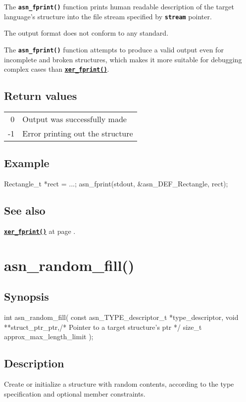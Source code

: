 \documentclass[english,oneside,12pt]{book}
\newcommand{\apisection}[2]{\clearpage\section{\label{#1}#2}}
\newcommand{\api}[2]{\hyperref[#1]{\code{#2}}}
\newcommand{\seealso}[2]{\api{#1}{#2} at page \pageref{#1}}
\newcommand{\code}[1]{\texttt{\textbf{\lstinline{#1}}}}
\begin{document}
The \code{asn_fprint()} function prints human readable description
of the target language's structure into the file stream specified by
\code{stream} pointer.

The output format does not conform to any standard.

The \code{asn_fprint()} function attempts to
produce a valid output even for incomplete and broken structures, which
makes it more suitable for debugging complex cases than
\api{sec:xer_fprint}{xer_fprint()}.

\subsection*{Return values}

\begin{tabular}[h!]{rl}
0 & Output was successfully made \\
-1 & Error printing out the structure
\end{tabular}

\subsection*{Example}
\begin{example}
Rectangle_t *rect = ...;
asn_fprint(stdout, &asn_DEF_Rectangle, rect);
\end{example}

\subsection*{See also}
\seealso{sec:xer_fprint}{xer_fprint()}.

\apisection{sec:asn_random_fill}{asn\_random\_fill()}

\subsection*{Synopsis}
\begin{signature}
int asn_random_fill(
    const asn_TYPE_descriptor_t *type_descriptor,
    void **struct_ptr_ptr,/* Pointer to a target structure's ptr */
    size_t approx_max_length_limit
);
\end{signature}

\subsection*{Description}

Create or initialize a structure with random contents, according to the type
specification and optional member constraints.
\end{document}
